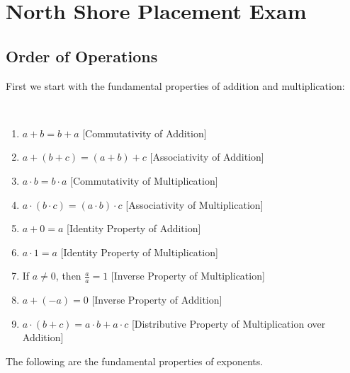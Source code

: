 \documentclass[../main.tex]{subfiles}
\begin{document}
\section{North Shore Placement Exam}
%
\subsection{Order of Operations}
%
First we start with the fundamental properties of addition and multiplication:
%
\begin{properties}
\label{property:North_Shore_Arithmetic_Properties}
\
\begin{enumerate}[itemsep=0pt]
    \item \label{property:North_Shore_Arithmetic_Properties_Com_Add} $a+b = b+a$ \hfill [Commutativity of Addition]
    \item \label{property:north_shore_arithmetic_properties_assoc_add} $a+(b+c) = (a+b)+c$ \hfill [Associativity of Addition]
    \item \label{property:north_shore_arithmetic_properties_comm_mult} $a\cdot b = b \cdot a$ \hfill [Commutativity of Multiplication]
    \item \label{property:north_shore_arithmetic_properties_assoc_mult} $a\cdot (b\cdot c) = (a\cdot b)\cdot c$ \hfill [Associativity of Multiplication]
    \item \label{property:north_shore_arithmetic_properties_add_idenity} $a+0 = a$ \hfill [Identity Property of Addition]
    \item \label{property:north_shore_arithmetic_properties_mult_identity} $a\cdot 1 = a$ \hfill [Identity Property of Multiplication]
    \item \label{property:north_shore_arithmetic_properties_mult_inverse} If $a\ne 0$, then $\frac{a}{a} = 1$ \hfill [Inverse Property of Multiplication]
    \item \label{property:north_shore_arithmetic_properties_add_inverse} $a + (-a) = 0$ \hfill [Inverse Property of Addition]
    \item \label{property:north_shore_arithmetic_properties_distributive_property} $a\cdot (b+c) = a\cdot b + a\cdot c$ \hfill [Distributive Property of Multiplication over Addition]
\end{enumerate}
\end{properties}
%
The following are the fundamental properties of exponents.
%
\end{document}
